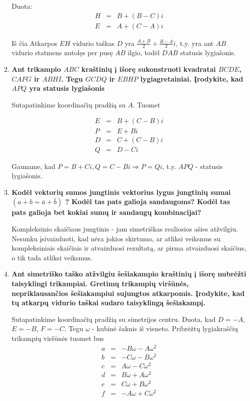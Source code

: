 \begin{enumerate}
Duota:
\begin{eqnarray*}
H &=& B + (B-C)i\\
E &=& A + (C-A)i
\end{eqnarray*}

Iš čia Atkarpos $EH$ vidurio taškas $D$ yra $\frac{A+B}{2} + \frac{B-A}{2}i$, t.y. yra ant $AB$ vidurio statmens nutolęs per pusę $AB$ ilgio, todėl $DAB$ statusis lygiašonis.
\medskip

\item \textbf{Ant trikampio $ABC$ kraštinių į išorę sukonstruoti kvadratai $BCDE$, $CAFG$ ir $ABHI$. Tegu $GCDQ$ ir $EBHP$ lygiagretainiai. Įrodykite, kad $APQ$ yra statusis lygiašonis}
\medskip

Sutapatinkime koordinačių pradžią su $A$. Tuomet

\begin{eqnarray*}
E &=& B + (C-B)i\\
P &=& E + Bi\\
D &=& C + (C-B)i\\
Q &=& D - Ci
\end{eqnarray*}

Gauname, kad $P = B + Ci, Q = C - Bi \Rightarrow P = Qi$, t.y. $APQ$ - statusis lygiašonis.  
\medskip

\item \textbf{Kodėl vektorių sumos jungtinis vektorius lygus jungtinių sumai $(\overline{a + b} = \bar{a} + \bar{b})$ ? Kodėl tas pats galioja sandaugoms? Kodėl tas pats galioja bet kokiai sumų ir sandaugų kombinacijai?}
\medskip

Kompleksinio skaičiaus jungtinis - jam simetriškas realiosios ašies atžvilgiu. Nesunku įsivaizduoti, kad nėra jokios skirtumo, ar atliksi veiksmus su kompleksiniais skaičiais ir atvaizduosi rezultatą, ar pirma atvaizduosi skaičius, o tik tada atliksi veiksmus. 
\medskip

\item \textbf{Ant simetriško taško atžvilgiu šešiakampio kraštinių į išorę nubrėžti taisyklingi trikampiai. Gretimų trikampių viršūnės, nepriklausančios šešiakampiui sujungtos atkarpomis. Įrodykite, kad tų atkarpų vidurio taškai sudaro taisyklingą šešiakampį. }
\medskip

Sutapatinkime koordinačių pradžią su simetrijos centru. Duota, kad $D = -A$, $E = -B$, $F = -C$. Tegu $\omega$ - kubinė šaknis iš vieneto. Pribrėžtų lygiakraščių trikampių viršūnės tuomet bus 
\begin{eqnarray*}
a &=& -B\omega - A\omega^2\\  
b &=& -C\omega - B\omega^2\\
c &=& A \omega - C\omega^2\\
d &=& B \omega + A\omega^2\\
e &=& C \omega + B\omega^2\\
f &=& -A\omega + C\omega^2
\end{eqnarray*}


\end{enumerate}
